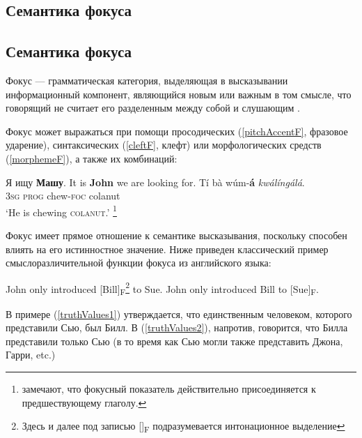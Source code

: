 \documentclass[a4paper, titlepage, 12pt]{article}
\begin{document}
\subsection{Семантика фокуса}

\subsection{Семантика фокуса}
Фокус --- грамматическая категория, выделяющая в высказывании информационный компонент, являющийся новым или важным в том смысле, что говорящий не считает его разделенным между собой и слушающим \citep{Jackendoff1972}.

\medskip

Фокус может выражаться при помощи просодических (\ref{pitchAccentF}, фразовое ударение), синтаксических (\ref{cleftF}, клефт) или морфологических средств (\ref{morphemeF}), а также их комбинаций:

\begin{exe}
    \ex
    \begin{xlist}
        \ex \label{pitchAccentF} Я ищу \textbf{Машу}.
        \ex \label{cleftF} It is \textbf{John} we are looking for.
        \ex \label{morphemeF}
            \gll Tí bà wúm-\textbf{á} \textit{kwálíngálá}. \\
                 \textsc{3sg} \textsc{prog} chew-\textsc{foc} colanut \\
            \glt `He is chewing \textsc{colanut}.' \citep[ex.\ 3b]{hartmann}\footnote{\citep{hartmann} замечают, что фокусный показатель действительно присоединяется к предшествующему глаголу.}
    \end{xlist}
\end{exe}

Фокус имеет прямое отношение к семантике высказывания, поскольку способен влиять на его истинностное значение. Ниже приведен классический пример смыслоразличительной функции фокуса из английского языка:

\begin{exe}
    \ex \begin{xlist}
        \ex \label{truthValues1} John only introduced [Bill]\textsubscript{F}\footnote{Здесь и далее под записью []\textsubscript{F} подразумевается интонационное выделение } to Sue.
        \ex \label{truthValues2} John only introduced Bill to [Sue]\textsubscript{F}.
    \end{xlist}
\end{exe}

В примере (\ref{truthValues1}) утверждается, что единственным человеком, которого представили Сью, был Билл. В (\ref{truthValues2}), напротив, говорится, что Билла представили только Сью (в то время как Сью могли также представить Джона, Гарри, etc.)
\end{document}
